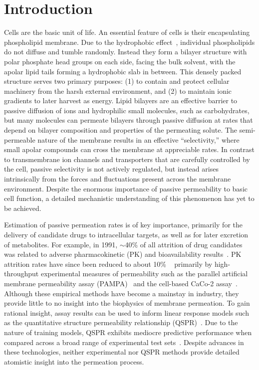 \section{Introduction}
\par Cells are the basic unit of life. An essential feature of cells is their encapsulating phospholipid membrane. Due to the hydrophobic effect~\cite{Tanford1979,Tanford1973}, individual phospholipids do not diffuse and tumble randomly.  Instead they form a bilayer structure with polar phosphate head groups on each side, facing the bulk solvent, with the apolar lipid tails forming a hydrophobic slab in between. This densely packed structure serves two primary purposes: (1) to contain and protect cellular machinery from the harsh external environment, and (2) to maintain ionic gradients to later harvest as energy. Lipid bilayers are an effective barrier to passive diffusion of ions and hydrophilic small molecules, such as carbohydrates, but many molecules can permeate bilayers through passive diffusion at rates that depend on bilayer composition and properties of the permeating solute. The semi-permeable nature of the membrane results in an effective ``selectivity,'' where small apolar compounds can cross the membrane at appreciable rates. In contrast to transmembrane ion channels and transporters that are carefully controlled by the cell, passive selectivity is not actively regulated, but instead arises intrinsically from the forces and fluctuations present across the membrane environment. Despite the enormous importance of passive permeability to basic cell function, a detailed mechanistic understanding of this phenomenon has yet to be achieved.

\par Estimation of passive permeation rates is of key importance, primarily for the delivery of candidate drugs to intracellular targets, as well as for later excretion of metabolites. For example, in 1991, $\sim$40\% of all attrition of drug candidates was related to adverse pharmacokinetic (PK) and bioavailability results~\cite{Kola2004}. PK attrition rates have since been reduced to about 10\% ~\cite{Tsaioun2009} primarily by high-throughput experimental measures of permeability such as the parallel artificial membrane permeability assay (PAMPA)~\cite{Kansy1998,Avdeef2005} and the cell-based CaCo-2 assay~\cite{Artursson2001,VanBreemen2005}. Although these empirical methods have become a mainstay in industry, they provide little to no insight into the biophysics of membrane permeation. To gain rational insight, assay results can be used to inform linear response models such as the quantitative structure permeability relationship (QSPR)~\cite{Hansch1972,Hansch1969}. Due to the nature of training models, QSPR exhibits mediocre predictive performance when compared across a broad range of experimental test sets~\cite{Stouch2003,Swift2013}. Despite advances in these technologies, neither experimental nor QSPR methods provide detailed atomistic insight into the permeation process.

